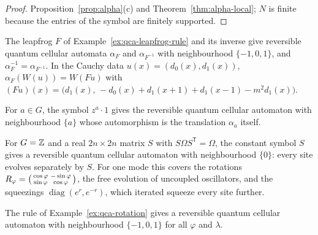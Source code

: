 \begin{proof}
Proposition~\ref{prop:alpha}(c) and Theorem~\ref{thm:alpha-local}; $N$ is finite because the entries of
the symbol are finitely supported. 
\end{proof}

\begin{example}\label{ex:ccr-leapfrog}
The leapfrog $F$ of Example~\ref{ex:qca-leapfrog-rule} and its inverse give reversible quantum
cellular automata $\alpha_F$ and $\alpha_{F^{-1}}$ with neighbourhood $\{-1,0,1\}$, and
$\alpha_F^{-1}=\alpha_{F^{-1}}$. In the Cauchy data $u(x)=(d_0(x),d_1(x))$,
$\alpha_F(W(u))=W(Fu)$ with $(Fu)(x)=\big(d_1(x),\,-d_0(x)+d_1(x+1)+d_1(x-1)-m^2d_1(x)\big)$.
\end{example}

\begin{example}[Shifts]\label{ex:ccr-shift}
For $a\in G$, the symbol $z^a\cdot1$ gives the reversible quantum cellular automaton with
neighbourhood $\{a\}$ whose automorphism is the translation $\alpha_a$ itself.
\end{example}

\begin{example}\label{ex:ccr-onsite}
For $G=\mathbb Z$ and a real $2n\times2n$ matrix $S$ with $S\Omega S^{\mathsf T}=\Omega$, the constant symbol $S$ gives a
reversible quantum cellular automaton with neighbourhood $\{0\}$: every site evolves separately by
$S$. For one mode this covers the rotations $R_\varphi=\begin{psmallmatrix}\cos\varphi&-\sin\varphi\\
\sin\varphi&\cos\varphi\end{psmallmatrix}$, the free evolution of uncoupled oscillators, and the
squeezings $\operatorname{diag}(e^r,e^{-r})$, which iterated squeeze every site further.
\end{example}

\begin{example}\label{ex:ccr-rotation}
The rule of Example~\ref{ex:qca-rotation} gives a reversible quantum cellular automaton with
neighbourhood $\{-1,0,1\}$ for all $\varphi$ and $\lambda$. 
\end{example}

